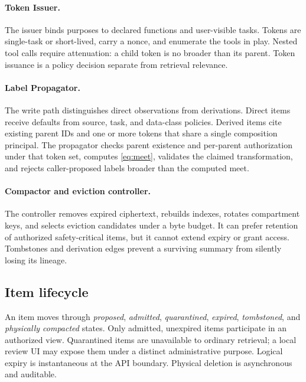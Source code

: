 \paragraph{Token Issuer.}
The issuer binds purposes to declared functions and user-visible tasks. Tokens are single-task or short-lived, carry a nonce, and enumerate the tools in play. Nested tool calls require attenuation: a child token is no broader than its parent. Token issuance is a policy decision separate from retrieval relevance.

\paragraph{Label Propagator.}
The write path distinguishes direct observations from derivations. Direct items receive defaults from source, task, and data-class policies. Derived items cite existing parent IDs and one or more tokens that share a single composition principal. The propagator checks parent existence and per-parent authorization under that token set, computes \cref{eq:meet}, validates the claimed transformation, and rejects caller-proposed labels broader than the computed meet.

\paragraph{Compactor and eviction controller.}
The controller removes expired ciphertext, rebuilds indexes, rotates compartment keys, and selects eviction candidates under a byte budget. It can prefer retention of authorized safety-critical items, but it cannot extend expiry or grant access. Tombstones and derivation edges prevent a surviving summary from silently losing its lineage.

\subsection{Item lifecycle}

An item moves through \emph{proposed}, \emph{admitted}, \emph{quarantined}, \emph{expired}, \emph{tombstoned}, and \emph{physically compacted} states. Only admitted, unexpired items participate in an authorized view. Quarantined items are unavailable to ordinary retrieval; a local review UI may expose them under a distinct administrative purpose. Logical expiry is instantaneous at the API boundary. Physical deletion is asynchronous and auditable.



